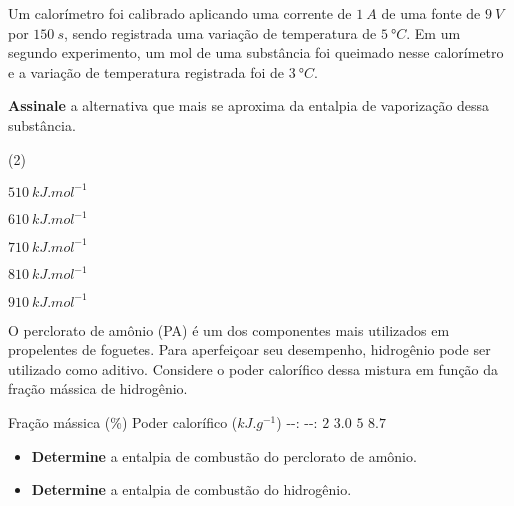 \documentclass[braun, twocolumn]{braun}
\begin{document}
\begin{problem}
[2A30]Um calorímetro foi calibrado aplicando uma corrente de \(\qty{1}{A}\) de
uma fonte de \(\qty{9}{V}\) por \(\qty{150}{s}\), sendo registrada uma
variação de temperatura de \(\qty{5}{\degree C}\). Em um segundo
experimento, um mol de uma substância foi queimado nesse calorímetro e a
variação de temperatura registrada foi de \(\qty{3}{\degree C}\).

\textbf{Assinale} a alternativa que mais se aproxima da entalpia de
vaporização dessa substância.


\begin{choices}
(2)
\item \(\qty{510}{kJ.mol^{-1}}\)

\item \(\qty{610}{kJ.mol^{-1}}\)

\item \(\qty{710}{kJ.mol^{-1}}\)

\item \(\qty{810}{kJ.mol^{-1}}\)

\item \(\qty{910}{kJ.mol^{-1}}\)

\end{choices}

\end{problem}



\begin{problem}
[2A31]O perclorato de amônio (PA) é um dos componentes mais utilizados em
propelentes de foguetes. Para aperfeiçoar seu desempenho, hidrogênio
pode ser utilizado como aditivo. Considere o poder calorífico dessa
mistura em função da fração mássica de hidrogênio.

Fração mássica (\%) \textbar{} Poder calorífico (\(\unit{kJ.g^{-1}}\))
\textbar{} -\/-: \textbar{} -\/-: \textbar{} \(\num{2}\) \textbar{}
\(\num{3,0}\) \textbar{} \(\num{5}\) \textbar{} \(\num{8,7}\) \textbar{}

\begin{itemize}

\item
  \textbf{Determine} a entalpia de combustão do perclorato de amônio.
\item
  \textbf{Determine} a entalpia de combustão do hidrogênio.
\end{itemize}

\end{problem}
\end{document}
